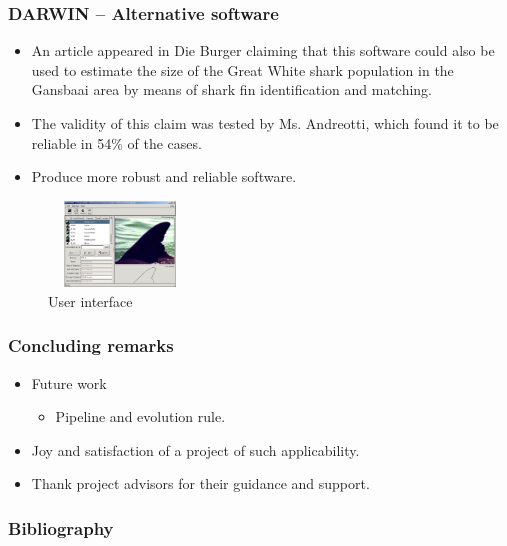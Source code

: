 \documentclass{beamer}
\newcommand{\myitem}{\item[$-$]}
\begin{document}
\begin{frame}
\frametitle{DARWIN -- Alternative software}
\begin{itemize}
 \item An article appeared in Die Burger claiming that this
 software could also be used to estimate the size of the Great White shark
 population in the Gansbaai area by means of shark fin identification and
 matching.\cite{Darwin}
 \pause
 \item The validity of this claim was tested by Ms. Andreotti, which found it to
 be reliable in 54\% of the cases.
 \pause
 \item Produce more robust and reliable software.
\end{itemize}
\pause
\begin{figure}
 \centering
 \includegraphics[width=1.5in, height=0.9in]{Darwin.jpg}
 \caption{User interface}
\end{figure}
\end{frame}


\begin{frame}
\frametitle{Concluding remarks}
\begin{itemize}
\item Future work
\begin{itemize}
 \myitem Pipeline and evolution rule.
\end{itemize}
\pause
\item Joy and satisfaction of a project of such applicability.
\item Thank project advisors for their guidance and support.
\end{itemize}
\end{frame}


\begin{frame}
\frametitle{Bibliography}


\end{frame}
\end{document}
